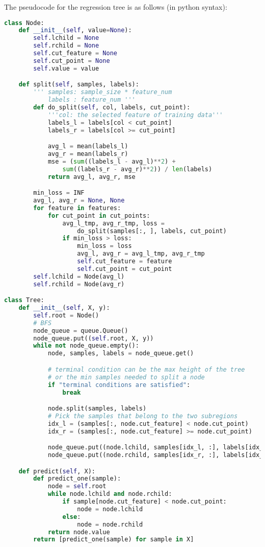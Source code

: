 \documentclass[UTF8,12pt]{article}
\newenvironment{answer}
{%
}
{}
\begin{document}
\begin{answer}
	The pseudocode for the regression tree is as follows (in python syntax):
	\begin{lstlisting}[language=python]
class Node:
    def __init__(self, value=None):
        self.lchild = None
        self.rchild = None
        self.cut_feature = None
        self.cut_point = None
        self.value = value

    def split(self, samples, labels):
        ''' samples: sample_size * feature_num
            labels : feature_num '''
        def do_split(self, col, labels, cut_point):
            '''col: the selected feature of training data'''
            labels_l = labels[col < cut_point]
            labels_r = labels[col >= cut_point]

            avg_l = mean(labels_l)
            avg_r = mean(labels_r)
			mse = (sum((labels_l - avg_l)**2) + 
				sum((labels_r - avg_r)**2)) / len(labels)
            return avg_l, avg_r, mse

        min_loss = INF
        avg_l, avg_r = None, None
        for feature in features: 
            for cut_point in cut_points:
				avg_l_tmp, avg_r_tmp, loss = 
					do_split(samples[:, ], labels, cut_point)
                if min_loss > loss:
                    min_loss = loss
                    avg_l, avg_r = avg_l_tmp, avg_r_tmp
                    self.cut_feature = feature
                    self.cut_point = cut_point
        self.lchild = Node(avg_l)
		self.rchild = Node(avg_r)

class Tree:
    def __init__(self, X, y):
        self.root = Node()
        # BFS
        node_queue = queue.Queue()
        node_queue.put((self.root, X, y))
        while not node_queue.empty():
            node, samples, labels = node_queue.get()

            # terminal condition can be the max height of the tree
            # or the min samples needed to split a node
            if "terminal conditions are satisfied":
                break

            node.split(samples, labels)
            # Pick the samples that belong to the two subregions
            idx_l = (samples[:, node.cut_feature] < node.cut_point)
            idx_r = (samples[:, node.cut_feature] >= node.cut_point)

            node_queue.put((node.lchild, samples[idx_l, :], labels[idx_l]))
            node_queue.put((node.rchild, samples[idx_r, :], labels[idx_r]))

    def predict(self, X):
        def predict_one(sample):
            node = self.root
            while node.lchild and node.rchild:
                if sample[node.cut_feature] < node.cut_point:
                    node = node.lchild
                else:
                    node = node.rchild
            return node.value
        return [predict_one(sample) for sample in X]
	\end{lstlisting}

\end{answer}
\end{document}
